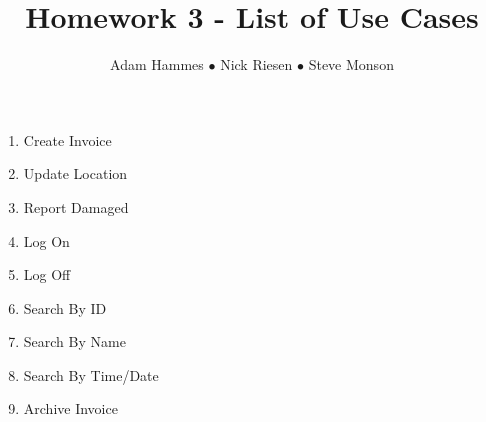 \documentclass{article}
\title{Homework 3 - List of Use Cases}
\author{Adam Hammes $\bullet$ Nick Riesen $\bullet$ Steve Monson}
\begin{document}
\maketitle

\begin{enumerate}
    \item Create Invoice
    \item Update Location
    \item Report Damaged
    \item Log On
    \item Log Off
    \item Search By ID
    \item Search By Name
    \item Search By Time/Date
    \item Archive Invoice
\end{enumerate}
\end{document}
